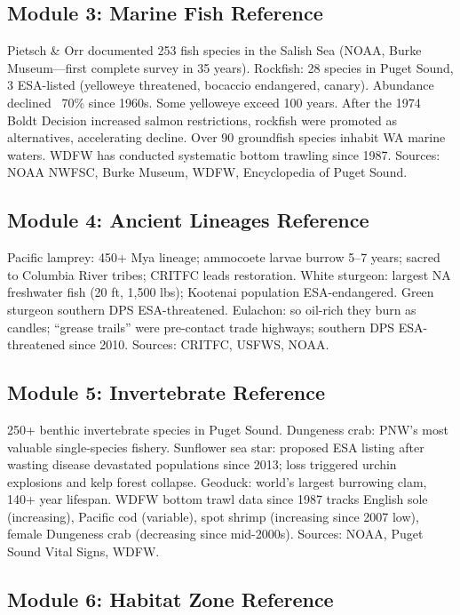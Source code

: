 \documentclass[11pt,letterpaper]{article}
\begin{document}
\subsection{Module 3: Marine Fish Reference}

Pietsch \& Orr documented 253 fish species in the Salish Sea (NOAA, Burke Museum---first complete survey in 35 years). Rockfish: 28 species in Puget Sound, 3 ESA-listed (yelloweye threatened, bocaccio endangered, canary). Abundance declined ~70\% since 1960s. Some yelloweye exceed 100 years. After the 1974 Boldt Decision increased salmon restrictions, rockfish were promoted as alternatives, accelerating decline. Over 90 groundfish species inhabit WA marine waters. WDFW has conducted systematic bottom trawling since 1987. Sources: NOAA NWFSC, Burke Museum, WDFW, Encyclopedia of Puget Sound.

\subsection{Module 4: Ancient Lineages Reference}

Pacific lamprey: 450+ Mya lineage; ammocoete larvae burrow 5--7 years; sacred to Columbia River tribes; CRITFC leads restoration. White sturgeon: largest NA freshwater fish (20 ft, 1,500 lbs); Kootenai population ESA-endangered. Green sturgeon southern DPS ESA-threatened. Eulachon: so oil-rich they burn as candles; ``grease trails'' were pre-contact trade highways; southern DPS ESA-threatened since 2010. Sources: CRITFC, USFWS, NOAA.

\subsection{Module 5: Invertebrate Reference}

250+ benthic invertebrate species in Puget Sound. Dungeness crab: PNW's most valuable single-species fishery. Sunflower sea star: proposed ESA listing after wasting disease devastated populations since 2013; loss triggered urchin explosions and kelp forest collapse. Geoduck: world's largest burrowing clam, 140+ year lifespan. WDFW bottom trawl data since 1987 tracks English sole (increasing), Pacific cod (variable), spot shrimp (increasing since 2007 low), female Dungeness crab (decreasing since mid-2000s). Sources: NOAA, Puget Sound Vital Signs, WDFW.

\subsection{Module 6: Habitat Zone Reference}
\end{document}
